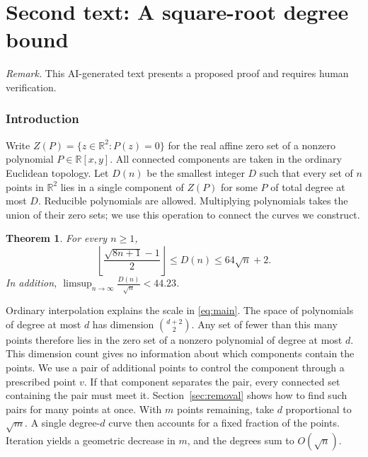 \documentclass[11pt,letterpaper]{article}
\newcommand{\R}{\mathbb R}
\newtheorem{theorem}{Theorem}[section]
\begin{document}
\part{Second text: A square-root degree bound}
\label{part:strong}
\setcounter{section}{0}
\setcounter{equation}{0}
\setcounter{figure}{0}
\begin{abstract}
Let $D(n)$ be the least degree sufficient to place any $n$ prescribed points in the real plane on one connected component of a polynomial zero set. We prove that $D(n)=\Theta(\sqrt n)$, with $D(n)\leq64\sqrt n+2$ for every $n$ and $\limsup_{n\to\infty}D(n)/\sqrt n<44.23$. The upper bound rests on a property of a pencil of degree-$d$ curves. Consider its rational parameter $F/G$ on a finite sample at which its values are distinct and its gradients are nonzero. For all but $O(d^2)$ sample points $v$, a path between two other sample points crosses the level of $v$ exactly once, at $v$. If the fiber is smooth, its component through $v$ separates the two endpoints. Averaging over interpolation conditions allows us to remove on the order of $d^2$ prescribed points and restore them at a cost of $d$ degrees.
\end{abstract}
\noindent\textit{Remark.} This AI-generated text presents a proposed proof and requires human verification.

\section{Introduction}
Write $Z(P)=\{z\in\R^2:P(z)=0\}$ for the real affine zero set of a nonzero polynomial $P\in\R[x,y]$. All connected components are taken in the ordinary Euclidean topology. Let $D(n)$ be the smallest integer $D$ such that every set of $n$ points in $\R^2$ lies in a single component of $Z(P)$ for some $P$ of total degree at most $D$. Reducible polynomials are allowed. Multiplying polynomials takes the union of their zero sets; we use this operation to connect the curves we construct.
\begin{theorem}\label{thm:strong}
For every $n\geq1$,
\begin{equation}\label{eq:main}
\left\lfloor\frac{\sqrt{8n+1}-1}{2}\right\rfloor
\leq D(n)\leq64\sqrt n+2.
\end{equation}
In addition, $\displaystyle\limsup_{n\to\infty}\frac{D(n)}{\sqrt n}<44.23$.
\end{theorem}
Ordinary interpolation explains the scale in \eqref{eq:main}. The space of polynomials of degree at most $d$ has dimension $\binom{d+2}{2}$. Any set of fewer than this many points therefore lies in the zero set of a nonzero polynomial of degree at most $d$. This dimension count gives no information about which components contain the points. We use a pair of additional points to control the component through a prescribed point $v$. If that component separates the pair, every connected set containing the pair must meet it. Section~\ref{sec:removal} shows how to find such pairs for many points at once. With $m$ points remaining, take $d$ proportional to $\sqrt m$. A single degree-$d$ curve then accounts for a fixed fraction of the points. Iteration yields a geometric decrease in $m$, and the degrees sum to $O(\sqrt n)$.
\end{document}
